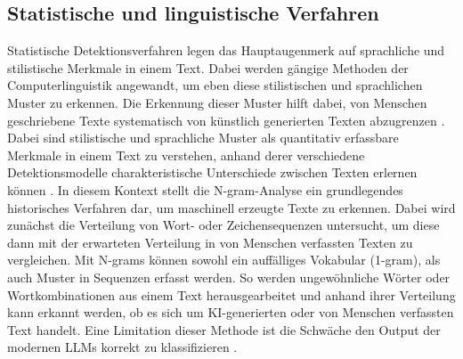 \subsection{Statistische und linguistische Verfahren}
Statistische Detektionsverfahren legen das Hauptaugenmerk auf sprachliche und stilistische Merkmale in einem Text. Dabei werden gängige Methoden der Computerlinguistik angewandt, um eben diese stilistischen und sprachlichen Muster zu erkennen. Die Erkennung dieser Muster hilft dabei, von Menschen geschriebene Texte systematisch von künstlich generierten Texten abzugrenzen \autocite{kehkashan2025}. Dabei sind stilistische und sprachliche Muster als quantitativ erfassbare Merkmale in einem Text zu verstehen, anhand derer verschiedene Detektionsmodelle charakteristische Unterschiede zwischen Texten erlernen können \autocite{Proehl_Mohrhardt_Foerster_Putzier_Zarnekow_2024}. In diesem Kontext stellt die N-gram-Analyse ein grundlegendes historisches Verfahren dar, um maschinell erzeugte Texte zu erkennen. Dabei wird zunächst die Verteilung von Wort- oder Zeichensequenzen untersucht, um diese dann mit der erwarteten Verteilung in von Menschen verfassten Texten zu vergleichen. Mit N-grams können sowohl ein auffälliges Vokabular (1-gram), als auch Muster in Sequenzen erfasst werden. So werden ungewöhnliche Wörter oder Wortkombinationen aus einem Text herausgearbeitet und anhand ihrer Verteilung kann erkannt werden, ob es sich um KI-generierten oder von Menschen verfassten Text handelt. Eine Limitation dieser Methode ist die Schwäche den Output der modernen LLMs korrekt zu klassifizieren \autocite{kehkashan2025}.
